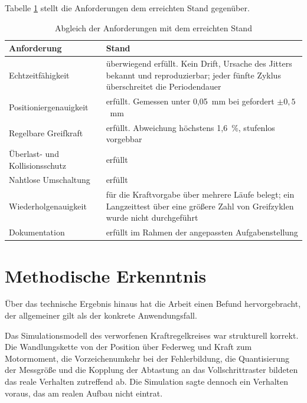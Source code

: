 Tabelle \ref{tab:anforderungsabgleich} stellt die Anforderungen dem erreichten Stand
gegenüber.

\begin{table}[htbp]
    \centering
    \caption{Abgleich der Anforderungen mit dem erreichten Stand}
    \label{tab:anforderungsabgleich}
    \begin{tabular}{lp{8.5cm}}
        \hline
        Anforderung & Stand \\
        \hline
        Echtzeitfähigkeit
            & überwiegend erfüllt. Kein Drift, Ursache des Jitters bekannt und
              reproduzierbar; jeder fünfte Zyklus überschreitet die Periodendauer \\[0.3em]
        Positioniergenauigkeit
            & erfüllt. Gemessen unter 0,05~mm bei gefordert $\pm 0{,}5$~mm \\[0.3em]
        Regelbare Greifkraft
            & erfüllt. Abweichung höchstens 1,6~\%, stufenlos vorgebbar \\[0.3em]
        Überlast- und Kollisionsschutz
            & erfüllt \\[0.3em]
        Nahtlose Umschaltung
            & erfüllt \\[0.3em]
        Wiederholgenauigkeit
            & für die Kraftvorgabe über mehrere Läufe belegt; ein Langzeittest über eine
              größere Zahl von Greifzyklen wurde nicht durchgeführt \\[0.3em]
        Dokumentation
            & erfüllt im Rahmen der angepassten Aufgabenstellung \\
        \hline
    \end{tabular}
\end{table}

\section{Methodische Erkenntnis}

Über das technische Ergebnis hinaus hat die Arbeit einen Befund hervorgebracht, der
allgemeiner gilt als der konkrete Anwendungsfall.

Das Simulationsmodell des verworfenen Kraftregelkreises war strukturell korrekt. Die
Wandlungskette von der Position über Federweg und Kraft zum Motormoment, die
Vorzeichenumkehr bei der Fehlerbildung, die Quantisierung der Messgröße und die Kopplung
der Abtastung an das Vollschrittraster bildeten das reale Verhalten zutreffend ab. Die
Simulation sagte dennoch ein Verhalten voraus, das am realen Aufbau nicht eintrat.

